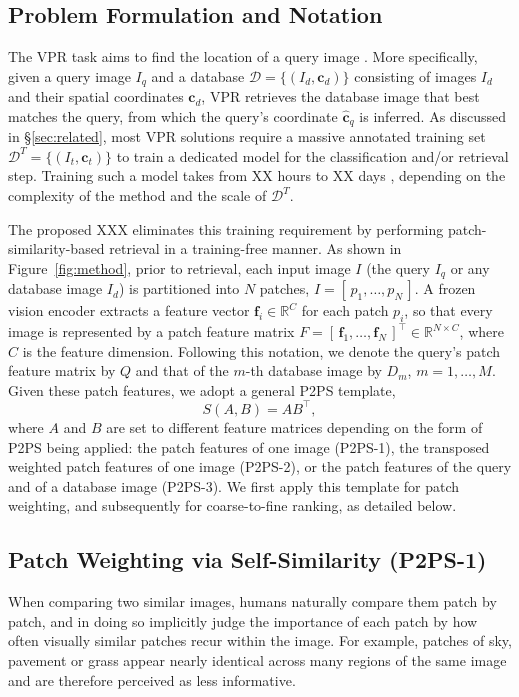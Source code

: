 \subsection{Problem Formulation and Notation}  %
\label{sec:prelim}
The VPR task aims to find the location of a query image \citep{netvlad}. More specifically, given a query image $I_q$ and a database $\mathcal{D}=\{(I_d,\mathbf c_d)\}$ consisting of images $I_d$ and their spatial coordinates $\mathbf c_d$, VPR retrieves the database image that best matches the query, from which the query's coordinate $\hat{\mathbf c}_q$ is inferred. As discussed in \S\ref{sec:related}, most VPR solutions require a massive annotated training set $\mathcal{D}^{T}=\{(I_t,\mathbf c_t)\}$ to train a dedicated model for the classification and/or retrieval step. Training such a model takes from XX hours \citep{} to XX days \citep{}, depending on the complexity of the method and the scale of $\mathcal{D}^{T}$.  %

The proposed XXX eliminates this training requirement by performing patch-similarity-based retrieval in a training-free manner. As shown in Figure~\ref{fig:method}, prior to retrieval, each input image $I$ (the query $I_q$ or any database image $I_d$) is partitioned into $N$ patches, $I=[\,p_1,\dots,p_N\,]$. A frozen vision encoder extracts a feature vector $\mathbf f_i\in\mathbb R^{C}$ for each patch $p_i$, so that every image is represented by a patch feature matrix $F=[\,\mathbf f_1,\dots,\mathbf f_N\,]^{\top}\in\mathbb R^{N\times C}$, where $C$ is the feature dimension. Following this notation, we denote the query's patch feature matrix by $Q$ and that of the $m$-th database image by $D_m$, $m=1,\dots,M$. Given these patch features, we adopt a general P2PS template,
\begin{equation}\label{eq:p2ps}
  S(A,B)=AB^{\top},
\end{equation}
where $A$ and $B$ are set to different feature matrices depending on the form of P2PS being applied: the patch features of one image (P2PS-1), the transposed weighted patch features of one image (P2PS-2), or the patch features of the query and of a database image (P2PS-3). We first apply this template for patch weighting, and subsequently for coarse-to-fine ranking, as detailed below.

\subsection{Patch Weighting via Self-Similarity (P2PS-1)}
\label{sec:feat}
When comparing two similar images, humans naturally compare them patch by patch, and in doing so implicitly judge the importance of each patch by how often visually similar patches recur within the image. For example, patches of sky, pavement or grass appear nearly identical across many regions of the same image and are therefore perceived as less informative.  %

